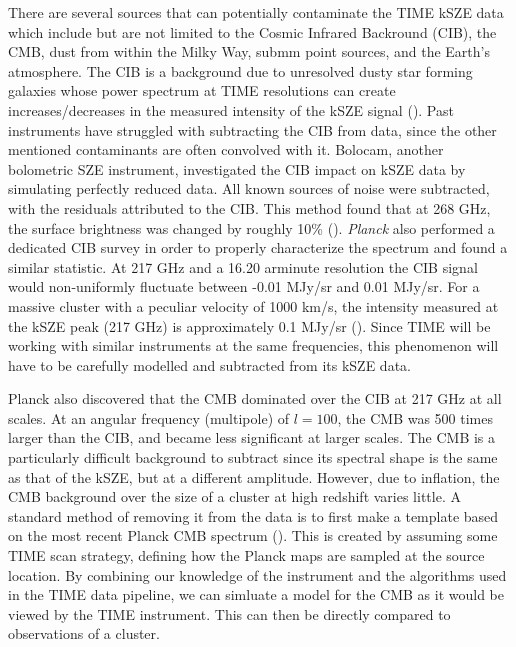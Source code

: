 \documentclass[manuscript]{aastex}
\begin{document}
There are several sources that can potentially contaminate the TIME kSZE data which include but are not limited to the Cosmic Infrared Backround (CIB), the CMB, dust from within the Milky Way, submm point sources, and the Earth's atmosphere. The CIB is a background due to unresolved dusty star forming galaxies whose power spectrum at TIME resolutions can create increases/decreases in the measured intensity of the kSZE signal (\cite{Planck2016b}). Past instruments have struggled with subtracting the CIB from data, since the other mentioned contaminants are often convolved with it. Bolocam, another bolometric SZE instrument, investigated the CIB impact on kSZE data by simulating perfectly reduced data. All known sources of noise were subtracted, with the residuals attributed to the CIB. This method found that at 268 GHz, the surface brightness was changed by roughly 10\% (\cite{Sayers2013}). \textit{Planck} also performed a dedicated CIB survey in order to properly characterize the spectrum and found a similar statistic.  At 217 GHz and a 16.20 arminute resolution the CIB signal would non-uniformly fluctuate between -0.01 MJy/sr and 0.01 MJy/sr. For a massive cluster with a peculiar velocity of 1000 km/s, the intensity measured at the kSZE peak (217 GHz) is approximately 0.1 MJy/sr (\cite{Planck2014}). Since TIME will be working with similar instruments at the same frequencies, this phenomenon will have to be carefully modelled and subtracted from its kSZE data. 

Planck also discovered that the CMB dominated over the CIB at 217 GHz at all scales. At an angular frequency (multipole) of \(l = 100\), the CMB was 500 times larger than the CIB, and became less significant at larger scales. The CMB is a particularly difficult background to subtract since its spectral shape is the same as that of the kSZE, but at a different amplitude. However, due to inflation, the CMB background over the size of a cluster at high redshift varies little. A standard method of removing it from the data is to first make a template based on the most recent Planck CMB spectrum (\cite{Planck2018}). This is created by assuming some TIME scan strategy, defining how the Planck maps are sampled at the source location. By combining our knowledge of the instrument and the algorithms used in the TIME data pipeline, we can simluate a model for the CMB as it would be viewed by the TIME instrument. This can then be directly compared to observations of a cluster. 
\end{document}
